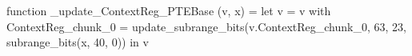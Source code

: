 function _update_ContextReg_PTEBase (v, x) = let v = { v with ContextReg_chunk_0 = update_subrange_bits(v.ContextReg_chunk_0, 63, 23, subrange_bits(x, 40, 0)) } in
  v
